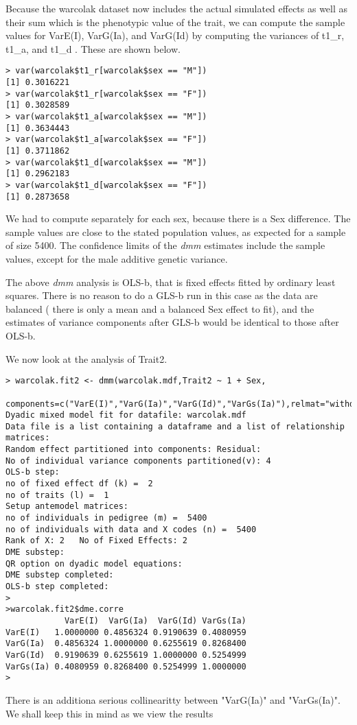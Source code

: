 \documentclass[titlepage]{article}  %
\begin{document}
 Because the warcolak dataset now includes the actual simulated effects as well as their sum which is the phenotypic value of the trait, we can compute the sample values for VarE(I), VarG(Ia), and VarG(Id) by computing the variances of t1\_r, t1\_a, and t1\_d . These are shown below.

\begin{verbatim}
> var(warcolak$t1_r[warcolak$sex == "M"])
[1] 0.3016221
> var(warcolak$t1_r[warcolak$sex == "F"])
[1] 0.3028589
> var(warcolak$t1_a[warcolak$sex == "M"])
[1] 0.3634443
> var(warcolak$t1_a[warcolak$sex == "F"])
[1] 0.3711862
> var(warcolak$t1_d[warcolak$sex == "M"])
[1] 0.2962183
> var(warcolak$t1_d[warcolak$sex == "F"])
[1] 0.2873658
\end{verbatim}
We had to compute separately for each sex, because there is a Sex difference. The sample values are close to the stated population values, as expected for a sample of size 5400. The confidence limits of the {\em dmm} estimates include the sample values, except for the male additive genetic variance.

	The above {\em dmm} analysis is OLS-b, that is fixed effects fitted by ordinary least squares. There is no reason to do a GLS-b run in this case as the data are balanced ( there is only a mean and a balanced Sex effect to fit), and the estimates of variance components after GLS-b would be identical to those after OLS-b.

	We now look at the analysis of Trait2.
\begin{verbatim}
> warcolak.fit2 <- dmm(warcolak.mdf,Trait2 ~ 1 + Sex,
   components=c("VarE(I)","VarG(Ia)","VarG(Id)","VarGs(Ia)"),relmat="withdf")
Dyadic mixed model fit for datafile: warcolak.mdf  
Data file is a list containing a dataframe and a list of relationship matrices:
Random effect partitioned into components: Residual:
No of individual variance components partitioned(v): 4 
OLS-b step:
no of fixed effect df (k) =  2 
no of traits (l) =  1 
Setup antemodel matrices:
no of individuals in pedigree (m) =  5400 
no of individuals with data and X codes (n) =  5400 
Rank of X: 2   No of Fixed Effects: 2 
DME substep:
QR option on dyadic model equations:
DME substep completed:
OLS-b step completed:
>
>warcolak.fit2$dme.corre
            VarE(I)  VarG(Ia)  VarG(Id) VarGs(Ia)
VarE(I)   1.0000000 0.4856324 0.9190639 0.4080959
VarG(Ia)  0.4856324 1.0000000 0.6255619 0.8268400
VarG(Id)  0.9190639 0.6255619 1.0000000 0.5254999
VarGs(Ia) 0.4080959 0.8268400 0.5254999 1.0000000
> 
\end{verbatim}
 There is an additiona serious collinearitty between "VarG(Ia)" and "VarGs(Ia)". We shall keep this in mind as we view the results
\end{document}
